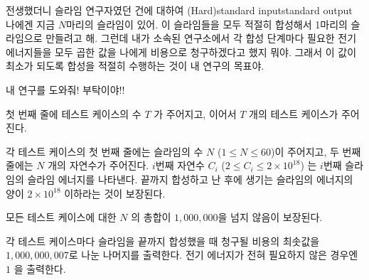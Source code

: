 \begin{problem}{전생했더니 슬라임 연구자였던 건에 대하여 (Hard)}{standard input}{standard output}
나에겐 지금 $N$마리의 슬라임이 있어. 이 슬라임들을 모두 적절히 합성해서
1마리의 슬라임으로 만들려고 해. 그런데 내가 소속된 연구소에서
각 합성 단계마다 필요한 전기 에너지들을 모두 곱한 값을 나에게 비용으로
청구하겠다고 했지 뭐야. 그래서 이 값이 최소가 되도록 합성을 적절히 수행하는 것이 내 연구의 목표야.

내 연구를 도와줘! 부탁이야!!

\InputFile
첫 번째 줄에 테스트 케이스의 수 $T$ 가 주어지고, 이어서 $T$ 개의 테스트 케이스가 주어진다.

각 테스트 케이스의 첫 번째 줄에는 슬라임의 수 $N$ ($1 \le N \le 60$)이 주어지고, 두 번째 줄에는 $N$ 개의 자연수가 주어진다. $i$번째 자연수 $C_i$ ($2 \le C_i \le 2 \times 10^{18}$) 는 $i$번째 슬라임의 슬라임 에너지를 나타낸다. 끝까지 합성하고 난 후에 생기는 슬라임의 에너지의 양이 $2 \times 10^{18}$ 이하라는 것이 보장된다.

모든 테스트 케이스에 대한 $N$ 의 총합이 $1,000,000$을 넘지 않음이 보장된다.

\OutputFile
각 테스트 케이스마다 슬라임을 끝까지 합성했을 때 청구될 비용의 최솟값을 $1,000,000,007$로 나눈 나머지를 출력한다.
전기 에너지가 전혀 필요하지 않은 경우엔 $1$ 을 출력한다.

\Example

\begin{example}
%
\end{example}

\end{problem}
